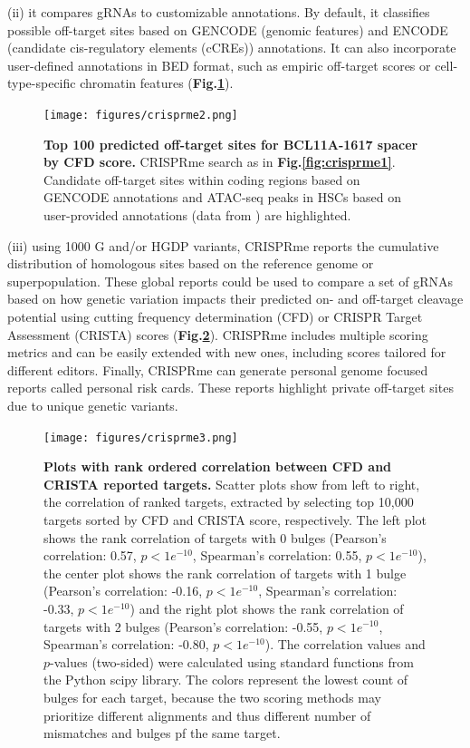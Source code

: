 \documentclass[a4paper, titlepage, openright]{book}
\newcommand{\crisprme}{CRISPRme\xspace}
\begin{document}
(ii) it compares gRNAs to customizable annotations. By default, it classifies possible off-target sites based on GENCODE \citep{frankish2019gencode} (genomic features) and ENCODE \citep{encode2012integrated} (candidate cis-regulatory elements (cCREs)) annotations. It can also incorporate user-defined annotations in BED format, such as empiric off-target scores or cell-type-specific chromatin features (\textbf{Fig.\ref{fig:crisprme2}}).  
\begin{figure}
	\centering
	\texttt{[image: figures/crisprme2.png]}
	\caption[Top 100 predicted off-target sites for BCL11A-1617 spacer by CFD score]{\textbf{Top 100 predicted off-target sites for BCL11A-1617 spacer by CFD score.} \crisprme search as in \textbf{Fig.\ref{fig:crisprme1}}. Candidate off-target sites within coding regions based on GENCODE annotations and ATAC-seq peaks in HSCs based on user-provided annotations (data from \citep{corces2016lineage}) are highlighted.}
	\label{fig:crisprme2}
\end{figure}
(iii) using 1000 G and/or HGDP variants, \crisprme reports the cumulative distribution of homologous sites based on the reference genome or superpopulation. These global reports could be used to compare a set of gRNAs based on how genetic variation impacts their predicted on- and off-target cleavage potential using cutting frequency determination (CFD) or CRISPR Target Assessment (CRISTA) scores \citep{abadi2017machine} (\textbf{Fig.\ref{fig:crisprme3}}). CRISPRme includes multiple scoring metrics and can be easily extended with new ones, including scores tailored for different editors. Finally, CRISPRme can generate personal genome focused reports called personal risk cards. These reports highlight private off-target sites due to unique genetic variants.
\begin{figure}
	\centering
	\texttt{[image: figures/crisprme3.png]}
	\caption[Plots with rank ordered correlation between CFD and CRISTA reported targets]{\textbf{Plots with rank ordered correlation between CFD and CRISTA reported targets.} Scatter plots show from left to right, the correlation of ranked targets, extracted by selecting top 10,000 targets sorted by CFD and CRISTA score, respectively. The left plot shows the rank correlation of targets with 0 bulges (Pearson's correlation: 0.57, $p < 1e^{-10}$, Spearman's correlation: 0.55, $p < 1e^{-10}$), the center plot shows the rank correlation of targets with 1 bulge (Pearson's correlation: -0.16, $p < 1e^{-10}$, Spearman's correlation: -0.33, $p < 1e^{-10}$) and the right plot shows the rank correlation of targets with 2 bulges (Pearson's correlation: -0.55, $p < 1e^{-10}$, Spearman's correlation: -0.80, $p < 1e^{-10}$). The correlation values and $p$-values (two-sided) were calculated using standard functions from the Python scipy library. The colors represent the lowest count of bulges for each target, because the two scoring methods may prioritize different alignments and thus different number of mismatches and bulges pf the same target.}
	\label{fig:crisprme3}
\end{figure}
\end{document}
